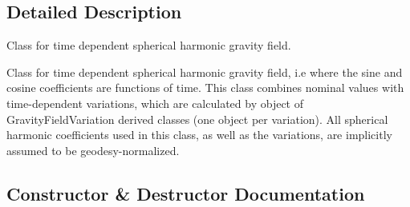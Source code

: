 \subsection{Detailed Description}
Class for time dependent spherical harmonic gravity field. 

Class for time dependent spherical harmonic gravity field, i.\+e where the sine and cosine coefficients are functions of time. This class combines nominal values with time-\/dependent variations, which are calculated by object of Gravity\+Field\+Variation derived classes (one object per variation). All spherical harmonic coefficients used in this class, as well as the variations, are implicitly assumed to be geodesy-\/normalized. 

\subsection{Constructor \& Destructor Documentation}
